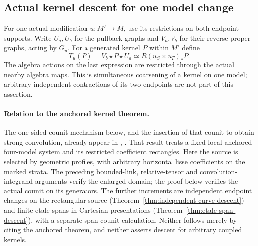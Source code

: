 \documentclass[11pt]{article}
\theoremstyle{definition}
\theoremstyle{remark}
\begin{document}
\subsection{Actual kernel descent for one model change}
For one actual modification $u:M'\to M$, use its restrictions on
both endpoint supports.  Write $U_a,U_b$ for the pullback graphs and
$V_a,V_b$ for their reverse proper graphs, acting by $G_u$.
For a generated kernel $P$ within $M'$ define
\[
 T_u(P)=V_b\star P\star U_a
       \simeq R(u_{S}\times u_T)_*P.
\]
The algebra actions on the last expression are restricted through
the actual nearby algebra maps.  This is simultaneous coarsening
of a kernel on one model; arbitrary independent contractions of
its two endpoints are not part of this assertion.

\paragraph{Relation to the anchored kernel theorem.}
The one-sided counit mechanism below, and the insertion of that
counit to obtain strong convolution, already appear in
\cite{Kernels}, . That result treats a
fixed local anchored four-model system and its restricted
coefficient rectangles. Here the source is selected by geometric
profiles, with arbitrary horizontal lisse coefficients on the
marked strata. The preceding bounded-link, relative-tensor and
convolution-integrand arguments verify the enlarged domain; the
proof below verifies the actual counit on its generators.
The further increments are independent endpoint changes on the
rectangular source (Theorem~\ref{thm:independent-curve-descent})
and finite etale spans in Cartesian presentations
(Theorem~\ref{thm:etale-span-descent}), with a separate span-counit
calculation. Neither follows merely by citing the anchored theorem,
and neither asserts descent for arbitrary coupled kernels.
\end{document}
